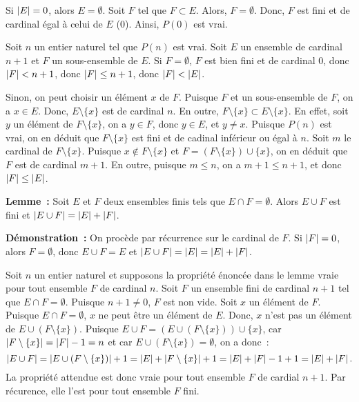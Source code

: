     Si $\left\lvert E \right\rvert = 0$, alors $E = \emptyset$.
    Soit $F$ tel que $F \subset E$. 
    Alors, $F = \emptyset$. 
    Donc, $F$ est fini et de cardinal égal à celui de $E$ ($0$).
    Ainsi, $P(0)$ est vrai.

    Soit $n$ un entier naturel tel que $P(n)$ est vrai. 
    Soit $E$ un ensemble de cardinal $n+1$ et $F$ un sous-ensemble de $E$. 
    Si $F = \emptyset$, $F$ est bien fini et de cardinal $0$, donc $\left\lvert F \right\rvert < n+1$, donc $\left\lvert F \right\rvert \leq n+1$, donc $\left\lvert F \right\rvert < \left\lvert E \right\rvert$.

    Sinon, on peut choisir un élément $x$ de $F$. 
    Puisque $F$ et un sous-ensemble de $F$, on a $x \in E$. 
    Donc, $E \setminus \lbrace x \rbrace$ est de cardinal $n$.
    En outre, $F \setminus \lbrace x \rbrace \subset E \setminus \lbrace x \rbrace$. 
    En effet, soit $y$ un élément de $F \setminus \lbrace x \rbrace$, on a $y \in F$, donc $y \in E$, et $y \neq x$.
    Puisque $P(n)$ est vrai, on en déduit que $F \setminus \lbrace x \rbrace$ est fini et de cadinal inférieur ou égal à $n$. 
    Soit $m$ le cardinal de $F \setminus \lbrace x \rbrace$. 
    Puisque $x \notin F \setminus \lbrace x \rbrace$ et $F = \left( F \setminus \lbrace x \rbrace \right) \cup \lbrace x \rbrace$, on en déduit que $F$ est de cardinal $m+1$.
    En outre, puisque $m \leq n$, on a $m+1 \leq n+1$, et donc $\left\lvert F \right\rvert \leq \left\lvert E \right\rvert$.

    \done

\noindent\textbf{Lemme :} Soit $E$ et $F$ deux ensembles finis tels que $E \cap F = \emptyset$.
    Alors $E \cup F$ est fini et $\left\lvert E \cup F \right\rvert = \left\lvert E \right\rvert + \left\lvert F \right\rvert$.

\medskip

\noindent\textbf{Démonstration :} On procède par récurrence sur le cardinal de $F$.
    Si $\left\lvert F \right\rvert = 0$, alors $F = \emptyset$, donc $E \cup F = E$ et $\left\lvert E \cup F \right\rvert = \left\lvert E \right\rvert = \left\lvert E \right\rvert + \left\lvert F \right\rvert$. 

    Soit $n$ un entier naturel et supposons la propriété énoncée dans le lemme vraie pour tout ensemble $F$ de cardinal $n$.
    Soit $F$ un ensemble fini de cardinal $n+1$ tel que $E \cap F = \emptyset$.
    Puisque $n+1 \neq 0$, $F$ est non vide.
    Soit $x$ un élément de $F$. 
    Puisque $E \cap F = \emptyset$, $x$ ne peut être un élément de $E$. 
    Donc, $x$ n'est pas un élément de $E \cup \left( F \setminus \lbrace x \rbrace \right)$.
    Puisque $E \cup F = \left( E \cup \left( F \setminus \lbrace x \rbrace \right) \right) \cup \lbrace x \rbrace$, car $\left\lvert F \setminus \lbrace x \rbrace \right\rvert = \left\lvert F \right\rvert - 1 = n$ et car $E \cup \left( F \setminus \lbrace x \rbrace \right) = \emptyset$, on a donc : 
    \begin{equation*}
        \left\lvert E \cup F \right\rvert = \left\lvert E \cup \left( F \setminus \lbrace x \rbrace \right) \right\rvert + 1
                       = \left\lvert E \right\rvert + \left\lvert F \setminus \lbrace x \rbrace \right\rvert + 1
                       = \left\lvert E \right\rvert + \left\lvert F \right\rvert - 1 + 1
                       = \left\lvert E \right\rvert + \left\lvert F \right\rvert.
    \end{equation*}
    La propriété attendue est donc vraie pour tout ensemble $F$ de cardial $n+1$. 
    Par récurence, elle l'est pour tout ensemble $F$ fini.

